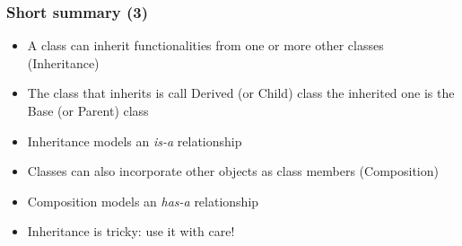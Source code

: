 \documentclass[9pt]{beamer}
\begin{document}
\begin{frame}
  \frametitle{Short summary (3)}

  \begin{itemize}
    \item A class can inherit functionalities from one or more other classes (Inheritance)
    \medskip
    \item The class that inherits is call Derived (or Child) class the inherited one is the Base (or Parent) class
    \medskip
    \item Inheritance models an \emph{is-a} relationship
    \medskip
    \item Classes can also incorporate other objects as class members (Composition)
    \medskip
    \item Composition models an \emph{has-a} relationship
    \medskip
    \item Inheritance is tricky: use it with care!
   \end{itemize}

\end{frame}
\end{document}
